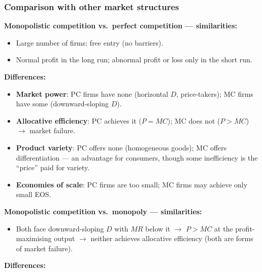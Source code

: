 \documentclass[a4paper,12pt]{article}
\begin{document}
\subsubsection*{Comparison with other market structures}
\textbf{Monopolistic competition vs.\ perfect competition --- similarities:}
\begin{itemize}
  \item Large number of firms; free entry (no barriers).
  \item Normal profit in the long run; abnormal profit or loss only in the short run.
\end{itemize}
\textbf{Differences:}
\begin{itemize}
  \item \textbf{Market power}: PC firms have none (horizontal $D$, price-takers); MC firms have some (downward-sloping $D$).
  \item \textbf{Allocative efficiency}: PC achieves it ($P = MC$); MC does not ($P > MC$) $\to$ market failure.
  \item \textbf{Product variety}: PC offers none (homogeneous goods); MC offers differentiation --- an advantage for consumers, though some inefficiency is the ``price'' paid for variety.
  \item \textbf{Economies of scale}: PC firms are too small; MC firms may achieve only small EOS.
\end{itemize}
\textbf{Monopolistic competition vs.\ monopoly --- similarities:}
\begin{itemize}
  \item Both face downward-sloping $D$ with $MR$ below it $\to$ $P > MC$ at the profit-maximising output $\to$ neither achieves allocative efficiency (both are forms of market failure).
\end{itemize}
\textbf{Differences:}
\end{document}
